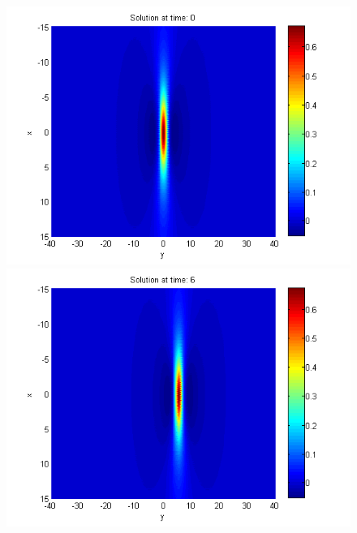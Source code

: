\documentclass{article}
\begin{document}
\begin{figure}[ht]\vspace{0.2cm}
\centering
	\begin{minipage}[b]{0.33\linewidth}
		\includegraphics[width=\linewidth]{../amitans/figures/solution_128x90_bt1_c090_T0.png}
	\end{minipage}	
	\begin{minipage}[b]{0.33\linewidth}
		\includegraphics[width=\linewidth]{../amitans/figures/solution_128x90_bt1_c090_T6.png}
	\end{minipage}	
	\begin{minipage}[b]{0.33\linewidth}

\end{minipage}
\end{figure}
\end{document}
